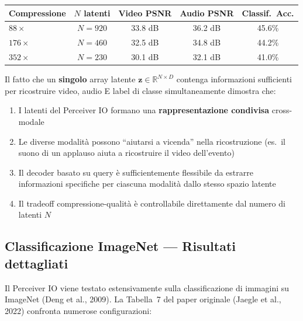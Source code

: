 \documentclass[12pt,a4paper]{article}
\begin{document}
\begin{center}
\begin{tabular}{lcccc}
\toprule
\textbf{Compressione} & \textbf{$N$ latenti} & \textbf{Video PSNR} & \textbf{Audio PSNR} & \textbf{Classif.\ Acc.} \\
\midrule
$88\times$ & $N = 920$ & 33.8 dB & 36.2 dB & 45.6\% \\
$176\times$ & $N = 460$ & 32.5 dB & 34.8 dB & 44.2\% \\
$352\times$ & $N = 230$ & 30.1 dB & 32.1 dB & 41.0\% \\
\bottomrule
\end{tabular}
\end{center}

\begin{notabox}
Il fatto che un \textbf{singolo} array latente $\mathbf{z} \in \mathbb{R}^{N \times D}$ contenga informazioni sufficienti per ricostruire video, audio E label di classe simultaneamente dimostra che:
\begin{enumerate}
    \item I latenti del Perceiver IO formano una \textbf{rappresentazione condivisa} cross-modale
    \item Le diverse modalit\`a possono ``aiutarsi a vicenda'' nella ricostruzione (es.\ il suono di un applauso aiuta a ricostruire il video dell'evento)
    \item Il decoder basato su query \`e sufficientemente flessibile da estrarre informazioni specifiche per ciascuna modalit\`a dallo stesso spazio latente
    \item Il tradeoff compressione-qualit\`a \`e controllabile direttamente dal numero di latenti $N$
\end{enumerate}
\end{notabox}


\subsection{Classificazione ImageNet --- Risultati dettagliati}

Il Perceiver IO viene testato estensivamente sulla classificazione di immagini su ImageNet (Deng et al., 2009). La Tabella~7 del paper originale (Jaegle et al., 2022) confronta numerose configurazioni:
\end{document}
